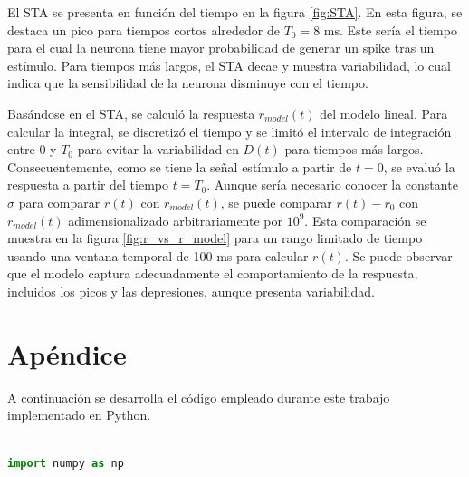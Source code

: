 \documentclass[aps,prb,twocolumn,superscriptaddress,floatfix,longbibliography]{revtex4-2}
\newcounter{para}
\begin{document}
El STA se presenta en función del tiempo en la figura \ref{fig:STA}. En esta figura, se destaca un pico para tiempos cortos alrededor de \( T_0 = 8 \) ms. Este sería el tiempo para el cual la neurona tiene mayor probabilidad de generar un spike tras un estímulo. Para tiempos más largos, el STA decae y muestra variabilidad, lo cual indica que la sensibilidad de la neurona disminuye con el tiempo.

Basándose en el STA, se calculó la respuesta  \( r_{model}(t) \) del modelo lineal. Para calcular la integral, se discretizó el tiempo y se limitó el intervalo de integración entre 0 y \( T_0 \) para evitar la variabilidad en \( D(t) \) para tiempos más largos. Consecuentemente, como se tiene la señal estímulo a partir de $t = 0$, se evaluó la respuesta a partir del tiempo \( t = T_0 \). Aunque sería necesario conocer la constante \( \sigma \) para comparar \( r(t) \) con \( r_{model}(t) \), se puede comparar \( r(t) - r_0 \) con \( r_{model}(t) \) adimensionalizado arbitrariamente por \( 10^9 \). Esta comparación se muestra en la figura \ref{fig:r_vs_r_model} para un rango limitado de tiempo usando una ventana temporal de 100 ms para calcular \( r(t) \). Se puede observar que el modelo captura adecuadamente el comportamiento de la respuesta, incluidos los picos y las depresiones, aunque presenta variabilidad.



\onecolumngrid

\section{Apéndice}

A continuación se desarrolla el código empleado durante este trabajo implementado en Python.

\begin{lstlisting}[language=Python]

import numpy as np


\end{lstlisting}


\end{document}
